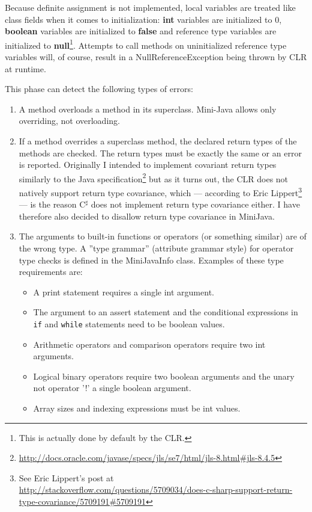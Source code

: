 \documentclass[a4paper,11pt]{article}
\begin{document}
Because definite assignment is not implemented, local variables are treated like class fields when it comes to initialization: \textbf{int} variables are initialized to 0, \textbf{boolean} variables are initialized to \textbf{false} and reference type variables are initialized to \textbf{null}\footnote{This is actually done by default by the CLR.}. Attempts to call methods on uninitialized reference type variables will, of course, result in a NullReferenceException being thrown by CLR at runtime.

This phase can detect the following types of errors:
\begin{enumerate}
\item A method overloads a method in its superclass. Mini-Java allows only overriding, not overloading.
\item If a method overrides a superclass method, the declared return types of the methods are checked. The return types must be exactly the same or an error is reported. Originally I intended to implement covariant return types similarly to the Java specification\footnote{\url{http://docs.oracle.com/javase/specs/jls/se7/html/jls-8.html\#jls-8.4.5}} but as it turns out, the CLR does not natively support return type covariance, which --- according to Eric Lippert\footnote{See Eric Lippert's post at \\ \url{http://stackoverflow.com/questions/5709034/does-c-sharp-support-return-type-covariance/5709191\#5709191}} --- is the reason C$^\sharp$ does not implement return type covariance either. I have therefore also decided to disallow return type covariance in MiniJava.
\item The arguments to built-in functions or operators (or something similar) are of the wrong type. A ''type grammar'' (attribute grammar style) for operator type checks is defined in the MiniJavaInfo class. Examples of these type requirements are:
\begin{itemize}
\item A print statement requires a single int argument.
\item The argument to an assert statement and the conditional expressions in \verb,if, and \verb,while, statements need to be boolean values.
\item Arithmetic operators and comparison operators require two int arguments.
\item Logical binary operators require two boolean arguments and the unary not operator '!' a single boolean argument.
\item Array sizes and indexing expressions must be int values.

\end{itemize}
\end{enumerate}
\end{document}
